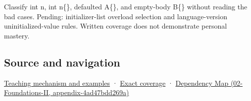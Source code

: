 Classify int n, int n\{\}, defaulted A\{\}, and empty-body B\{\} without reading the bad cases. Pending: initializer-list overload selection and language-version uninitialized-value rules. Written coverage does not demonstrate personal mastery.

\subsection{Source and navigation}\label{source-and-navigation}

\href{Continuous\%20Notes/Computing\%20Foundations\%20-\%20From\%20Bits\%20to\%20C++\%20and\%20Systems\%20APIs\#Empty\%20syntax\%20does\%20not\%20promise\%20initialized\%20members}{Teaching mechanism and examples} · \hyperref[appendix-fd090d982a15]{Exact coverage} · \href{}{Dependency Map (02-Foundations-II, appendix-4ad47bdd269a)}
